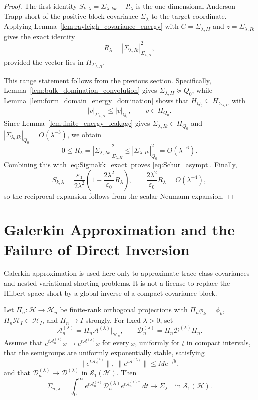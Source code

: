 \begin{proof}
The first identity $S_{k,\lambda}=\Sigma_{\lambda,kk}-R_\lambda$ is the
one-dimensional Anderson--Trapp short of the positive block covariance
$\Sigma_\lambda$ to the target coordinate.  Applying
Lemma~\ref{lem:rayleigh_covariance_energy} with
$C=\Sigma_{\lambda,II}$ and $z=\Sigma_{\lambda,Ik}$ gives the exact identity
\[
  R_\lambda=|\Sigma_{\lambda,Ik}|_{\Sigma_{\lambda,II}}^2,
\]
provided the vector lies in $H_{\Sigma_{\lambda,II}}$.

This range statement follows from the previous section.  Specifically, Lemma~\ref{lem:bulk_domination_convolution} gives
$\Sigma_{\lambda,II}\succeq Q_0$, while Lemma~\ref{lem:form_domain_energy_domination} shows that
$H_{Q_0}\subseteq H_{\Sigma_{\lambda,II}}$ with
\[
  |v|_{\Sigma_{\lambda,II}}\le |v|_{Q_0},
  \qquad v\in H_{Q_0}.
\]
Since Lemma~\ref{lem:finite_energy_leakage} gives
$\Sigma_{\lambda,Ik}\in H_{Q_0}$ and
$|\Sigma_{\lambda,Ik}|_{Q_0}=O(\lambda^{-3})$, we obtain
\[
  0\le R_\lambda
  =|\Sigma_{\lambda,Ik}|_{\Sigma_{\lambda,II}}^2
  \le |\Sigma_{\lambda,Ik}|_{Q_0}^2
  =O(\lambda^{-6}).
\]
Combining this with \eqref{eq:Sigmakk_exact} proves
\eqref{eq:Schur_asympt}.  Finally,
\[
  S_{k,\lambda}
  =\frac{\varepsilon_0}{2\lambda^2}
   \left(1-\frac{2\lambda^2}{\varepsilon_0}R_\lambda\right),
  \qquad
  \frac{2\lambda^2}{\varepsilon_0}R_\lambda=O(\lambda^{-4}),
\]
so the reciprocal expansion follows from the scalar Neumann expansion.
\end{proof}

\section{Galerkin Approximation and the Failure of Direct Inversion}
\label{app:galerkin_shorting}

Galerkin approximation is used here only to approximate trace-class covariances
and nested variational shorting problems.  It is not a license to replace the
Hilbert-space short by a global inverse of a compact covariance block.

\begin{lemma}
\label{lem:galerkin_trace_norm}
Let $\Pi_n:\mathcal{H}\to\mathcal{H}_n$ be finite-rank orthogonal projections
with $\Pi_n\phi_k=\phi_k$, $\Pi_n\mathcal{H}_I\subset\mathcal{H}_I$, and
$\Pi_n\to I$ strongly.  For fixed $\lambda>0$, set
\[
  \mathcal{A}_n^{(\lambda)}
  =\Pi_n\mathcal{A}^{(\lambda)}|_{\mathcal{H}_n},
  \qquad
  \mathcal{D}_n^{(\lambda)}
  =\Pi_n\mathcal{D}^{(\lambda)}\Pi_n .
\]
Assume that $e^{t\mathcal{A}_n^{(\lambda)}}x\to
e^{t\mathcal{A}^{(\lambda)}}x$ for every $x$, uniformly for $t$ in compact
intervals, that the semigroups are uniformly exponentially stable, satisfying
\[
  \|e^{t\mathcal{A}_n^{(\lambda)}}\|,\
  \|e^{t\mathcal{A}^{(\lambda)}}\|\le Me^{-\beta t},
\]
and that $\mathcal{D}_n^{(\lambda)}\to\mathcal{D}^{(\lambda)}$ in
$\mathcal{S}_1(\mathcal{H})$.  Then
\[
  \Sigma_{n,\lambda}
  =
  \int_0^\infty
  e^{t\mathcal{A}_n^{(\lambda)}}
  \mathcal{D}_n^{(\lambda)}
  e^{t\mathcal{A}_n^{(\lambda)*}}\,dt
  \longrightarrow
  \Sigma_\lambda
  \quad\text{in }\mathcal{S}_1(\mathcal{H}).
\]
\end{lemma}

